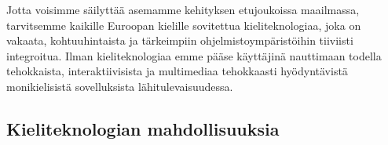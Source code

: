 \begin{multicols}{2}
Jotta voisimme säilyttää asemamme kehityksen etujoukoissa maailmassa,
tarvitsemme kaikille Euroopan kielille sovitettua kieliteknologiaa, joka on
vakaata, kohtuuhintaista ja tärkeimpiin ohjelmistoympäristöihin tiiviisti
integroitua. Ilman kieliteknologiaa emme pääse käyttäjinä nauttimaan todella
tehokkaista, interaktiivisista ja multimediaa tehokkaasti hyödyntävistä
monikielisistä sovelluksista lähitulevaisuudessa.



\subsection{Kieliteknologian mahdollisuuksia}



\end{multicols}
